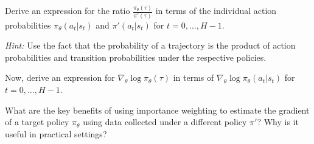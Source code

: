 \documentclass[11pt]{article}
\begin{document}
 Derive an expression for the ratio $\frac{\pi_{\theta}(\tau)}{\pi'(\tau)}$ in terms of the individual action probabilities $\pi_{\theta}(a_t|s_t)$ and $\pi'(a_t|s_t)$ for $t = 0, \dots, H-1$.
\newline

\noindent \textit{Hint:} Use the fact that the probability of a trajectory is the product of action probabilities and transition probabilities under the respective policies.
\newline

 Now, derive an expression for $\nabla_{\theta} \log \pi_{\theta}(\tau)$ in terms of $\nabla_{\theta} \log \pi_{\theta}(a_t|s_t)$ for $t = 0, \dots, H-1$.
\newline

What are the key benefits of using importance weighting to estimate the gradient of a target policy $\pi_\theta$ using data collected under a different policy $\pi'$? Why is it useful in practical settings?
\end{document}
